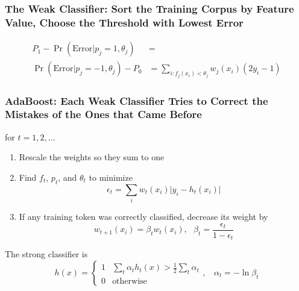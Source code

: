\documentclass{beamer}
\begin{document}
\begin{frame}
  \frametitle{The Weak Classifier: Sort the Training Corpus by Feature Value, Choose the Threshold with Lowest Error}

  \begin{align*}
    P_1-\Pr(\text{Error}|p_j=1,\theta_j) &=\\
    \Pr(\text{Error}|p_j=-1,\theta_j)-P_0 &=
    \sum_{i:f_j(x_i)<\theta_j} w_j(x_i)(2y_i-1)
  \end{align*}
\end{frame}

\begin{frame}
  \frametitle{AdaBoost: Each Weak Classifier Tries to Correct the Mistakes of the Ones that Came Before}

  for $t=1,2,\ldots$
  \begin{enumerate}
  \item Rescale the weights so they sum to one
  \item Find $f_t$, $p_t$, and $\theta_t$ to minimize
    \begin{displaymath}
      \epsilon_t = \sum_i w_t(x_i)\vert y_i-h_t(x_i)\vert
    \end{displaymath}
  \item If any training token was correctly classified, decrease its weight by
    \begin{displaymath}
      w_{t+1}(x_i) = \beta_tw_t(x_i),~~~\beta_t =\frac{\epsilon_t}{1-\epsilon_t}
    \end{displaymath}
  \end{enumerate}
  The strong classifier is
  \begin{displaymath}
    h(x)=\begin{cases}
    1 & \sum_t \alpha_th_t(x)>\frac{1}{2}\sum_t\alpha_t\\
    0 & \mbox{otherwise}
    \end{cases},~~~~\alpha_t=-\ln\beta_t
  \end{displaymath}
\end{frame}
\end{document}
